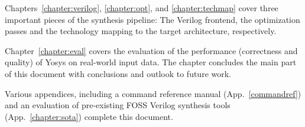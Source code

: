 Chapters~\ref{chapter:verilog}, \ref{chapter:opt}, and \ref{chapter:techmap}
cover three important pieces of the synthesis pipeline: The Verilog frontend,
the optimization passes and the technology mapping to the target architecture,
respectively.

Chapter~\ref{chapter:eval} covers the evaluation of the performance
(correctness and quality) of Yosys on real-world input data.
The chapter concludes the main part of this document with conclusions and
outlook to future work.

Various appendices, including a command reference manual
(App.~\ref{commandref}) and an evaluation of pre-existing FOSS Verilog
synthesis tools (App.~\ref{chapter:sota}) complete this document.


